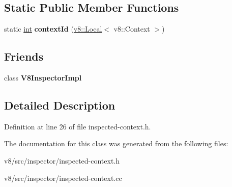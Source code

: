 \subsection*{Static Public Member Functions}
\begin{DoxyCompactItemize}
\item 
\mbox{\label{classv8__inspector_1_1InspectedContext_a40b319b66c235b91b5091af2b4b49c56}} 
static \mbox{\hyperlink{classint}{int}} {\bfseries context\+Id} (\mbox{\hyperlink{classv8_1_1Local}{v8\+::\+Local}}$<$ v8\+::\+Context $>$)
\end{DoxyCompactItemize}
\subsection*{Friends}
\begin{DoxyCompactItemize}
\item 
\mbox{\label{classv8__inspector_1_1InspectedContext_a5ce5a412f1b3b4cd9575ea6d931ae724}} 
class {\bfseries V8\+Inspector\+Impl}
\end{DoxyCompactItemize}


\subsection{Detailed Description}


Definition at line 26 of file inspected-\/context.\+h.



The documentation for this class was generated from the following files\+:\begin{DoxyCompactItemize}
\item 
v8/src/inspector/inspected-\/context.\+h\item 
v8/src/inspector/inspected-\/context.\+cc\end{DoxyCompactItemize}
